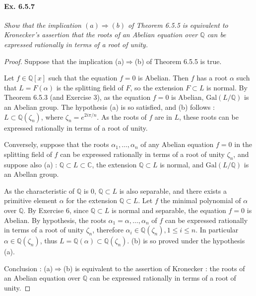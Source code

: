 \documentclass[11pt,a4paper]{article}
\newcommand{\Q}{\mathbb{Q}}
\newcommand{\C}{\mathbb{C}}
\newcommand{\Gal}{\mathrm{Gal}}
\begin{document}
\paragraph{Ex. 6.5.7}

{\it Show that the implication $(a) \Rightarrow (b)$ of Theorem 6.5.5 is equivalent to Kronecker's assertion that the roots of an Abelian equation over $\Q$ can be expressed rationally in terms of a root of unity.
}

\begin{proof}
Suppose that the implication (a)$\Rightarrow$(b) of Theorem 6.5.5 is true.

Let $f \in \Q[x]$ such that the equation $f=0$ is Abelian. Then $f$ has a root $\alpha$ such that $L = F(\alpha)$ is the splitting field of $F$, so the extension $F \subset L$ is normal. By Theorem 6.5.3 (and Exercise 3), as the equation $f=0$ is Abelian, $\Gal(L/\Q)$ is an Abelian group. The hypothesis (a) is so satisfied, and  (b) follows : $L \subset \Q(\zeta_n)$, where $\zeta_n =e^{2i\pi/n}$. As the roots of $f$ are in $L$, these roots can be expressed rationally in terms of a root of unity.

Conversely, suppose that the roots $\alpha_1,\ldots,\alpha_n$ of any Abelian equation $f=0$ in the splitting field of $f$ can be expressed rationally in terms of a root of unity
 $\zeta_n$, and suppose also (a) : $\Q\subset L \subset \C$, the extension $\Q\subset L$ is normal, and $\Gal(L/\Q)$ is an Abellan group.
 
 As the characteristic of $\Q$ is 0, $\Q\subset L$  is also separable, and there exists a primitive element $\alpha$ for the extension  $\Q \subset L$. Let $f$ the minimal polynomial of $\alpha$ over $\Q$. By Exercise 6, since $\Q\subset L$ is normal and separable, the equation $f=0$ is Abelian. By hypothesis, the roots  $\alpha_1=\alpha,\ldots,\alpha_n$ of $f$ can be expressed rationally in terms of a root of unity $\zeta_n$, therefore $\alpha_i \in \Q(\zeta_n), 1\leq i \leq n$. In particular $\alpha \in \Q(\zeta_n)$, thus $L = \Q(\alpha) \subset \Q(\zeta_n)$. (b) is so proved under the hypothesis (a).


Conclusion : (a)$\Rightarrow$(b) is equivalent to the assertion of Kronecker : the roots of an Abelian equation over $\Q$ can be expressed rationally in terms of a root of unity.
\end{proof}
\end{document}
